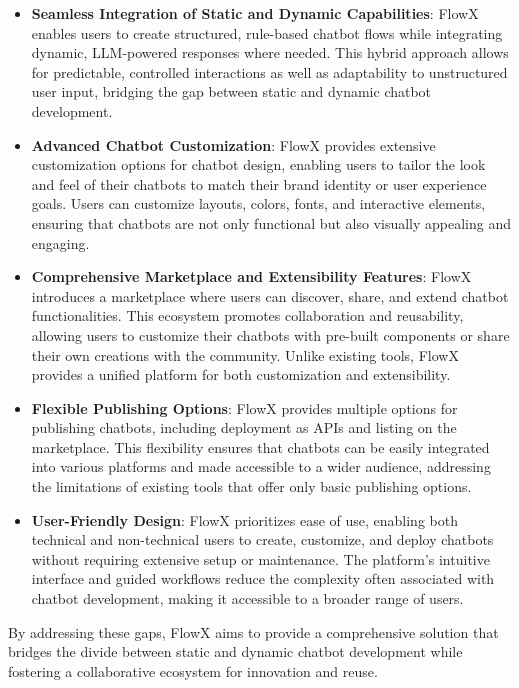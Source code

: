 \begin{itemize}
    \item \textbf{Seamless Integration of Static and Dynamic Capabilities}: FlowX enables users to create structured, rule-based chatbot flows while integrating dynamic, LLM-powered responses where needed. This hybrid approach allows for predictable, controlled interactions as well as adaptability to unstructured user input, bridging the gap between static and dynamic chatbot development.
    
    \item \textbf{Advanced Chatbot Customization}: FlowX provides extensive customization options for chatbot design, enabling users to tailor the look and feel of their chatbots to match their brand identity or user experience goals. Users can customize layouts, colors, fonts, and interactive elements, ensuring that chatbots are not only functional but also visually appealing and engaging.
    
    \item \textbf{Comprehensive Marketplace and Extensibility Features}: FlowX introduces a marketplace where users can discover, share, and extend chatbot functionalities. This ecosystem promotes collaboration and reusability, allowing users to customize their chatbots with pre-built components or share their own creations with the community. Unlike existing tools, FlowX provides a unified platform for both customization and extensibility.
    
    \item \textbf{Flexible Publishing Options}: FlowX provides multiple options for publishing chatbots, including deployment as APIs and listing on the marketplace. This flexibility ensures that chatbots can be easily integrated into various platforms and made accessible to a wider audience, addressing the limitations of existing tools that offer only basic publishing options.
    
    \item \textbf{User-Friendly Design}: FlowX prioritizes ease of use, enabling both technical and non-technical users to create, customize, and deploy chatbots without requiring extensive setup or maintenance. The platform's intuitive interface and guided workflows reduce the complexity often associated with chatbot development, making it accessible to a broader range of users.
\end{itemize}

By addressing these gaps, FlowX aims to provide a comprehensive solution that bridges the divide between static and dynamic chatbot development while fostering a collaborative ecosystem for innovation and reuse.

